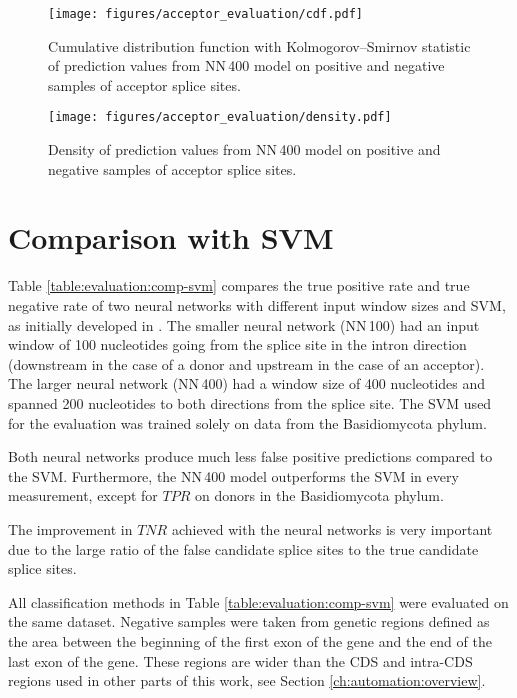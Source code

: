 \begin{figure}
  \centering
  \texttt{[image: figures/acceptor\_evaluation/cdf.pdf]}
  \caption{Cumulative distribution function with Kolmogorov–Smirnov statistic
    of prediction values from NN\,400 model on positive and negative samples of
    acceptor splice sites.}
  \label{fig:evaluation:acceptor-cdf}
\end{figure}

\begin{figure}
  \centering
  \texttt{[image: figures/acceptor\_evaluation/density.pdf]}
  \caption{Density of prediction values from NN\,400 model on positive and
    negative samples of acceptor splice sites.}
  \label{fig:evaluation:acceptor-density}
\end{figure}

\section{\label{ch:evaluation:comparison}Comparison with SVM}

Table \ref{table:evaluation:comp-svm} compares the true positive rate and true
negative rate of two neural networks with different input window sizes and SVM,
as initially developed in \cite{barucic}. The smaller neural network (NN\,100)
had an input window of 100 nucleotides going from the splice site in the intron
direction (downstream in the case of a donor and upstream in the case of an
acceptor). The larger neural network (NN\,400) had a window size of 400
nucleotides and spanned 200 nucleotides to both directions from the splice
site. The SVM used for the evaluation was trained solely on data from the
Basidiomycota phylum.

Both neural networks produce much less false positive predictions compared to
the SVM. Furthermore, the NN\,400 model outperforms the SVM in every
measurement, except for $\mathit{TPR}$ on donors in the Basidiomycota phylum.

The improvement in $\mathit{TNR}$ achieved with the neural networks is very
important due to the large ratio of the false candidate splice sites to the
true candidate splice sites.

All classification methods in Table \ref{table:evaluation:comp-svm} were
evaluated on the same dataset. Negative samples were taken from genetic regions
defined as the area between the beginning of the first exon of the gene and the
end of the last exon of the gene. These regions are wider than the CDS and
intra-CDS regions used in other parts of this work, see Section
\ref{ch:automation:overview}.

